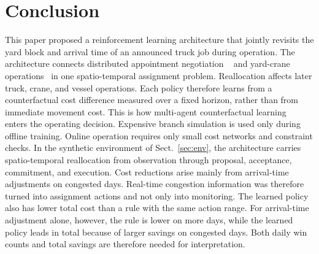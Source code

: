 \section{Conclusion}
\label{sec:concl}

This paper proposed a reinforcement learning architecture that jointly
revisits the yard block and arrival time of an announced truck job during
operation. The architecture connects distributed appointment negotiation
~\cite{ref6} and yard-crane operations~\cite{ref7,ref8} in one
spatio-temporal assignment problem. Reallocation affects later truck,
crane, and vessel operations. Each policy therefore learns from a
counterfactual cost difference measured over a fixed horizon, rather
than from immediate movement cost. This is how multi-agent
counterfactual learning~\cite{ref10,ref11} enters the operating
decision. Expensive branch simulation is used only during offline
training. Online operation requires only small cost networks and
constraint checks.
In the synthetic environment of Sect.~\ref{sec:env}, the architecture carries
spatio-temporal reallocation from observation through proposal,
acceptance, commitment, and execution. Cost reductions arise mainly from
arrival-time adjustments on congested days. Real-time congestion information was therefore turned into assignment
actions and not only into monitoring. The learned policy also has lower total
cost than a rule with the same action range. For arrival-time adjustment
alone, however, the rule is lower on more days, while the learned policy
leads in total because of larger savings on congested days. Both daily
win counts and total savings are therefore needed for interpretation.

